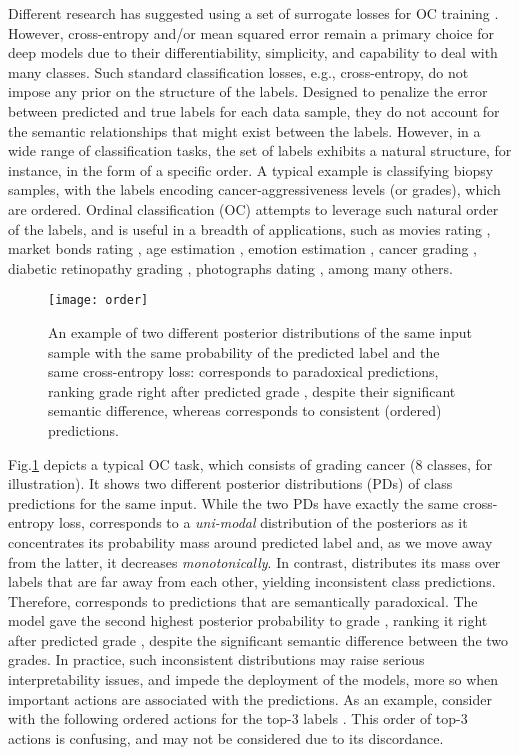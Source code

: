 \documentclass[8pt]{article}
\theoremstyle{definition}
\begin{document}
Different research has suggested using a set of surrogate losses for OC training \citep{pedregosa2017consistency,rennie2005loss}. However, cross-entropy and/or mean squared error remain a primary choice for deep models due to their differentiability, simplicity, and capability to deal with many classes. Such standard classification losses, e.g., cross-entropy, do not impose any prior on the structure of the labels. Designed to penalize the error between predicted and true labels for each data sample, they do not account for the semantic relationships that might exist between the labels. However, in a wide range of classification tasks, the set of labels exhibits a natural structure, for instance, in the form of a specific order. A typical example is classifying biopsy samples, with the labels encoding cancer-aggressiveness levels (or grades), which are ordered. Ordinal classification (OC) attempts to leverage such natural order of the labels, and is useful in a breadth of applications, such as movies rating \citep{crammer2002pranking,Koren2011}, market bonds rating \citep{moody1994architecture}, age estimation \citep{liu2017ordinal,pan2018mean,zhu2019ordinal}, emotion estimation \citep{jia2019facial,XiongLiuZhongFu2019,zhou2015emotion}, cancer grading \citep{gentry2015penalized}, diabetic retinopathy grading \citep{beckham2017unimodal}, photographs dating \citep{palermo2012datingdataset}, among many others.


\begin{figure}[h!]
  \centering
  \texttt{[image: order]}
  \caption{An example of two different posterior distributions of the same input sample with the same probability of the predicted label  and the same cross-entropy loss:  corresponds to paradoxical predictions, ranking grade  right after predicted grade , despite their significant semantic difference, whereas  corresponds to consistent (ordered) predictions.}
  \label{fig:fig-0}
\end{figure}


Fig.\ref{fig:fig-0} depicts a typical OC task, which consists of grading cancer (8 classes, for illustration). It shows two different posterior distributions (PDs) of class predictions for the same input. While the two PDs have exactly the same cross-entropy loss,  corresponds to a {\em uni-modal} distribution of the posteriors as it
concentrates its probability mass around predicted label  and, as we move away from the latter, it decreases {\em monotonically}. In contrast,  distributes its mass over labels that are far away from each other, yielding inconsistent class predictions. Therefore,  corresponds to predictions that are semantically paradoxical. The model gave the second highest posterior probability to grade , ranking it right after predicted grade , despite the significant semantic difference between the two grades. In practice, such inconsistent distributions may raise serious interpretability issues, and impede the deployment of the models, more so when important actions are associated with the predictions. As an example, consider  with the following ordered actions for the top-3 labels . This order of top-3 actions is confusing, and may not be considered due to its discordance.
\end{document}
